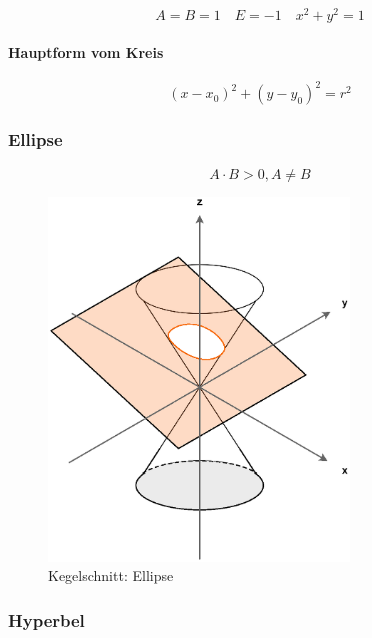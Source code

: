 \[
    A = B = 1 \quad E = -1 \quad x^2 + y^2 = 1  
\]

\paragraph{Hauptform vom Kreis}

\[
    {(x - x_0)}^2 + {(y - y_0)}^2 = r^2
\]


\subsubsection{Ellipse}

\[
    A \cdot B > 0, A \neq B  
\]

\begin{figure}[H]
    \centering
    \includegraphics[width=8cm]{grafiken/kegelschnitte/ellipse}
    \caption{Kegelschnitt: Ellipse}
\end{figure}


\subsubsection{Hyperbel}

